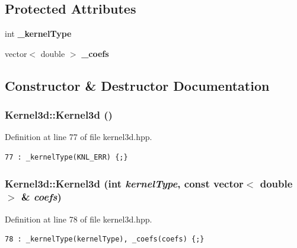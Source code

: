 \subsection*{Protected Attributes}
\begin{CompactItemize}
\item 
int {\bf \_\-kernel\-Type}
\item 
vector$<$ double $>$ {\bf \_\-coefs}
\end{CompactItemize}


\subsection{Constructor \& Destructor Documentation}
\subsubsection{\setlength{\rightskip}{0pt plus 5cm}Kernel3d::Kernel3d ()\hspace{0.3cm}{\tt  [inline]}}\label{classKernel3d_b2209b9bbb94ff18eb0ef7ab6b833d44_b2209b9bbb94ff18eb0ef7ab6b833d44}




Definition at line 77 of file kernel3d.hpp.

\footnotesize\begin{verbatim}77 : _kernelType(KNL_ERR) {;}
\end{verbatim}\normalsize 


\subsubsection{\setlength{\rightskip}{0pt plus 5cm}Kernel3d::Kernel3d (int {\em kernel\-Type}, const vector$<$ double $>$ \& {\em coefs})\hspace{0.3cm}{\tt  [inline]}}\label{classKernel3d_6193b24f1f7ac14daa0efd2edcde6f30_6193b24f1f7ac14daa0efd2edcde6f30}




Definition at line 78 of file kernel3d.hpp.

\footnotesize\begin{verbatim}78 : _kernelType(kernelType), _coefs(coefs) {;}
\end{verbatim}\normalsize 


